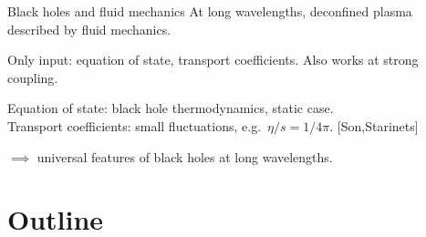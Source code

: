 \documentclass{beamer}
\newcommand{\rref}[1]{\hfill \small{\color{darkgrey} [#1]}}
\begin{document}
%
%


\begin{frame}{Black holes and fluid mechanics}
%
 At long wavelengths, deconfined plasma described by fluid mechanics.

 \vp Only input: equation of state, transport coefficients. Also works at strong coupling.

 \vp {}Equation of state: black hole thermodynamics, static case.\\
 Transport coefficients: small fluctuations, e.g.\ $\eta/s = 1/4\pi$. \rref{Son,Starinets}

 \vp $\implies$ universal features of black holes at long wavelengths.
%
\end{frame}


\section*{Outline}
\end{document}
